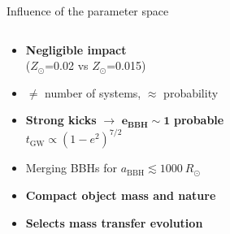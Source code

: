 \documentclass{beamer} %
\begin{document}
\begin{frame}[noframenumbering]{Influence of the parameter space}
	\small
	\begin{columns}
		\begin{column}{0.59\textwidth}
			\begin{itemize}
				\item \textbf{Negligible impact} \\ ($Z_\odot$=0.02 vs $Z_\odot$=0.015)
				\item $\neq$ number of systems, $\approx$ probability
			\end{itemize}
			\bigskip
			\begin{itemize}
				\item \textbf{Strong kicks} $\rightarrow$ $\bm{e}_{\textbf{BBH}} \sim \textbf{1}$ \textbf{probable} \\
				$t_{\text{GW}} \propto (1-e^2)^{7/2}$ 
				\item Merging BBHs for $a_{\text{BBH}} \lesssim 1000~R_\odot$
			\end{itemize}
			\bigskip
			\begin{itemize}
				\item \textbf{Compact object mass and nature}
				\item \textbf{Selects mass transfer evolution}
			\end{itemize}				
		\end{column}
		\begin{column}{0.5\textwidth}

\end{column}
\end{columns}
\end{frame}
\end{document}
